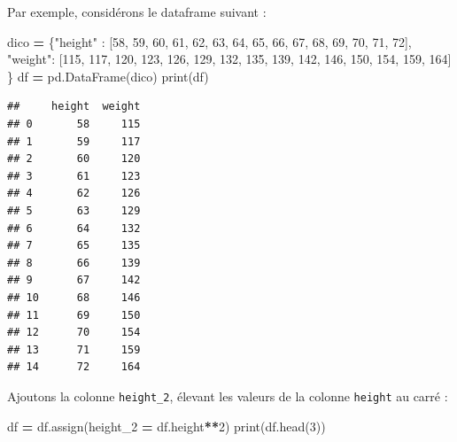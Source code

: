 \documentclass[12pt,]{book}
\newenvironment{Shaded}{\begin{snugshade}}{\end{snugshade}}
\newcommand{\DecValTok}[1]{\textcolor[rgb]{0.00,0.00,0.81}{#1}}
\newcommand{\StringTok}[1]{\textcolor[rgb]{0.31,0.60,0.02}{#1}}
\newcommand{\OperatorTok}[1]{\textcolor[rgb]{0.81,0.36,0.00}{\textbf{#1}}}
\newcommand{\BuiltInTok}[1]{#1}
\newcommand{\NormalTok}[1]{#1}
\numberwithin{equation}{section}
\numberwithin{countremarque}{section}
\begin{document}
Par exemple, considérons le dataframe suivant :

\begin{Shaded}
\begin{Highlighting}[]
\NormalTok{dico }\OperatorTok{=}\NormalTok{ \{}\StringTok{"height"}\NormalTok{ : }
\NormalTok{               [}\DecValTok{58}\NormalTok{, }\DecValTok{59}\NormalTok{, }\DecValTok{60}\NormalTok{, }\DecValTok{61}\NormalTok{, }\DecValTok{62}\NormalTok{,}
                \DecValTok{63}\NormalTok{, }\DecValTok{64}\NormalTok{, }\DecValTok{65}\NormalTok{, }\DecValTok{66}\NormalTok{, }\DecValTok{67}\NormalTok{,}
                \DecValTok{68}\NormalTok{, }\DecValTok{69}\NormalTok{, }\DecValTok{70}\NormalTok{, }\DecValTok{71}\NormalTok{, }\DecValTok{72}\NormalTok{],}
        \StringTok{"weight"}\NormalTok{: }
\NormalTok{               [}\DecValTok{115}\NormalTok{, }\DecValTok{117}\NormalTok{, }\DecValTok{120}\NormalTok{, }\DecValTok{123}\NormalTok{, }\DecValTok{126}\NormalTok{,}
                \DecValTok{129}\NormalTok{, }\DecValTok{132}\NormalTok{, }\DecValTok{135}\NormalTok{, }\DecValTok{139}\NormalTok{, }\DecValTok{142}\NormalTok{,}
                \DecValTok{146}\NormalTok{, }\DecValTok{150}\NormalTok{, }\DecValTok{154}\NormalTok{, }\DecValTok{159}\NormalTok{, }\DecValTok{164}\NormalTok{]}
\NormalTok{       \} }
\NormalTok{df }\OperatorTok{=}\NormalTok{ pd.DataFrame(dico)}
\BuiltInTok{print}\NormalTok{(df)}
\end{Highlighting}
\end{Shaded}

\begin{lstlisting}
##     height  weight
## 0       58     115
## 1       59     117
## 2       60     120
## 3       61     123
## 4       62     126
## 5       63     129
## 6       64     132
## 7       65     135
## 8       66     139
## 9       67     142
## 10      68     146
## 11      69     150
## 12      70     154
## 13      71     159
## 14      72     164
\end{lstlisting}

Ajoutons la colonne \texttt{height\_2}, élevant les valeurs de la
colonne \texttt{height} au carré :

\begin{Shaded}
\begin{Highlighting}[]
\NormalTok{df }\OperatorTok{=}\NormalTok{ df.assign(height_2 }\OperatorTok{=}\NormalTok{ df.height}\OperatorTok{**}\DecValTok{2}\NormalTok{)}
\BuiltInTok{print}\NormalTok{(df.head(}\DecValTok{3}\NormalTok{))}
\end{Highlighting}
\end{Shaded}
\end{document}
